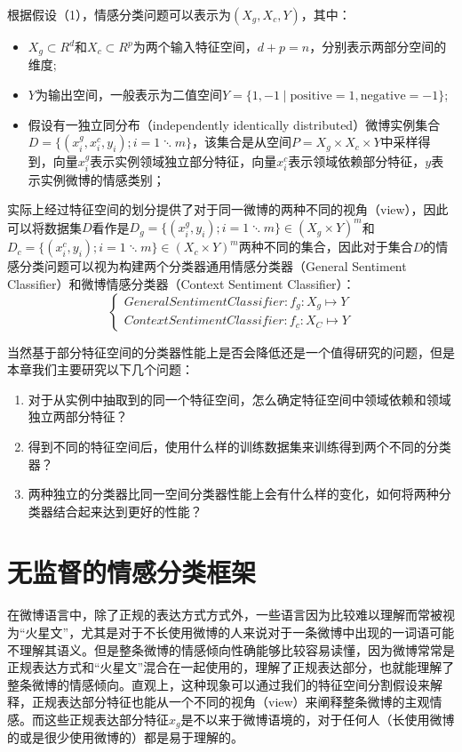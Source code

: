 \begin{definition}[情感分类]
根据假设（1），情感分类问题可以表示为$(X_{g},X_{c},Y)$，其中：
\begin{itemize}
\item $ X_{g}\subset R^d$和$ X_{c}\subset R^p$为两个输入特征空间，$d+p=n$，分别表示两部分空间的维度;
\item $Y$为输出空间，一般表示为二值空间$ Y=\lbrace 1,-1\mid \mathrm{positive}=1,\mathrm{negative}=-1 \rbrace$;
\item 假设有一独立同分布（independently identically distributed）微博实例集合$D=\{(x_i^g,x_i^c,y_i);i=1\ddots m\}$，该集合是从空间$P=X_g \times X_c \times Y$中采样得到，向量$x_i^g$表示实例领域独立部分特征，向量$x_i^c$表示领域依赖部分特征，$y$表示实例微博的情感类别；
\end{itemize}
实际上经过特征空间的划分提供了对于同一微博的两种不同的视角（view），因此可以将数据集$D$看作是$D_g=\{(x_i^g,y_i);i=1\ddots m\} \in (X_g \times Y)^m$和$D_c=\{(x_i^c,y_i);i=1\ddots m\} \in (X_c \times Y)^m$两种不同的集合，因此对于集合$D$的情感分类问题可以视为构建两个分类器通用情感分类器（General Sentiment Classifier）和微博情感分类器（Context Sentiment Classifier）：
\begin{equation}
\begin{cases}
General Sentiment Classifier:f_g:X_g \mapsto Y\\
Context Sentiment Classifier:f_c:X_C \mapsto Y
\end{cases}
\end{equation}
\end{definition}
当然基于部分特征空间的分类器性能上是否会降低还是一个值得研究的问题，但是本章我们主要研究以下几个问题：
\begin{enumerate}
\item 对于从实例中抽取到的同一个特征空间，怎么确定特征空间中领域依赖和领域独立两部分特征？
\item 得到不同的特征空间后，使用什么样的训练数据集来训练得到两个不同的分类器？
\item 两种独立的分类器比同一空间分类器性能上会有什么样的变化，如何将两种分类器结合起来达到更好的性能？
\end{enumerate}

\section{无监督的情感分类框架}
\label{ch4_frame}
在微博语言中，除了正规的表达方式方式外，一些语言因为比较难以理解而常被视为“火星文”，尤其是对于不长使用微博的人来说对于一条微博中出现的一词语可能不理解其语义。但是整条微博的情感倾向性确能够比较容易读懂，因为微博常常是正规表达方式和“火星文”混合在一起使用的，理解了正规表达部分，也就能理解了整条微博的情感倾向。直观上，这种现象可以通过我们的特征空间分割假设来解释，正规表达部分特征也能从一个不同的视角（view）来阐释整条微博的主观情感。而这些正规表达部分特征$ x_{g} $是不以来于微博语境的，对于任何人（长使用微博的或是很少使用微博的）都是易于理解的。

